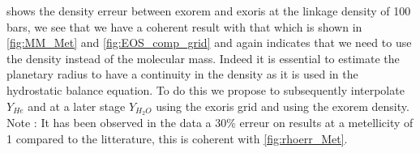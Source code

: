  shows the density erreur between exorem and exoris at the linkage density of 100 bars, we see that we have a coherent result with that which is shown in \cref{fig:MM_Met} and \cref{fig:EOS_comp_grid} and again indicates that we need to use the density instead of the molecular mass. Indeed it is essential to estimate the planetary radius to have a continuity in the density as it is used in the hydrostatic balance equation. To do this we propose to subsequently interpolate $Y_{He}$ and at a later stage $Y_{H_2O}$ using the exoris grid and using the exorem density. 
Note : It has been observed in the data a 30\% erreur on results at a metellicity of 1 compared to the litterature, this is coherent with \cref{fig:rhoerr_Met}.